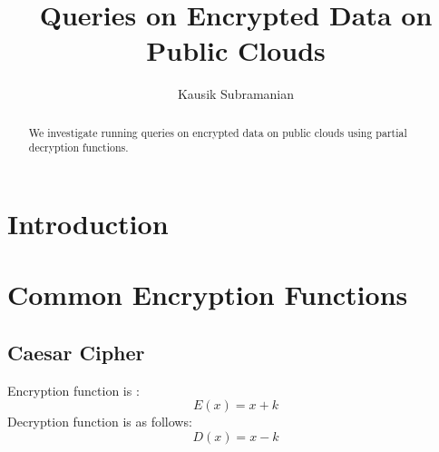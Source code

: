 \documentclass[]{article}
\title{Queries on Encrypted Data on Public Clouds}
\author{Kausik Subramanian}
\begin{document}
\maketitle

\begin{abstract}
We investigate running queries on encrypted data on public clouds using partial decryption functions. 
\end{abstract}

\section{Introduction}

\section{Common Encryption Functions}
\subsection{Caesar Cipher}
Encryption function is :
 \begin{equation}
 E(x) = x + k
 \end{equation}
Decryption function is as follows:
\begin{equation}
	D(x) = x - k
\end{equation}
\end{document}
